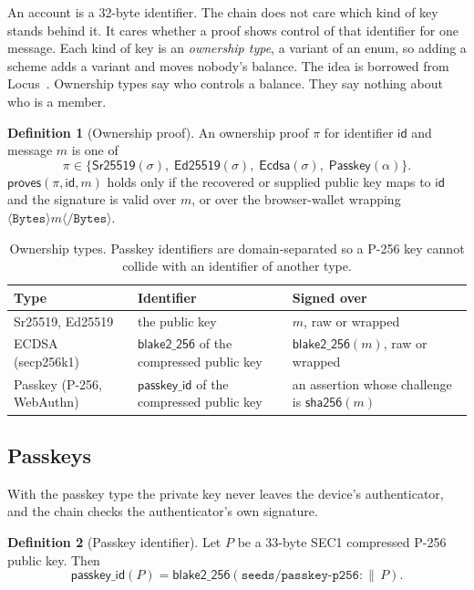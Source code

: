 \documentclass[11pt,a4paper]{article}
\theoremstyle{definition}
\newtheorem{definition}{Definition}[section]
\theoremstyle{plain}
\theoremstyle{remark}
\newcommand{\id}{\mathsf{id}}
\begin{document}
An account is a 32-byte identifier. The chain does not care which kind of key stands behind it. It cares whether a proof shows control of that identifier for one message. Each kind of key is an \emph{ownership type}, a variant of an enum, so adding a scheme adds a variant and moves nobody's balance. The idea is borrowed from Locus~\cite{locus2025}. Ownership types say who controls a balance. They say nothing about who is a member.

\begin{definition}[Ownership proof]
An ownership proof $\pi$ for identifier $\id$ and message $m$ is one of
\[
  \pi \in \{\mathsf{Sr25519}(\sigma),\; \mathsf{Ed25519}(\sigma),\; \mathsf{Ecdsa}(\sigma),\; \mathsf{Passkey}(\alpha)\}.
\]
$\mathsf{proves}(\pi, \id, m)$ holds only if the recovered or supplied public key maps to $\id$ and the signature is valid over $m$, or over the browser-wallet wrapping $\langle\texttt{Bytes}\rangle m \langle\texttt{/Bytes}\rangle$.
\end{definition}

\begin{table}[h]
\centering
\caption{Ownership types. Passkey identifiers are domain-separated so a P-256 key cannot collide with an identifier of another type.}
\label{tab:ownership}
\begin{tabularx}{\textwidth}{@{}l>{\raggedright\arraybackslash}X>{\raggedright\arraybackslash}X@{}}
\toprule
Type & Identifier & Signed over \\
\midrule
Sr25519, Ed25519 & the public key & $m$, raw or wrapped \\
ECDSA (secp256k1) & $\mathsf{blake2\_256}$ of the compressed public key & $\mathsf{blake2\_256}(m)$, raw or wrapped \\
Passkey (P-256, WebAuthn) & $\mathsf{passkey\_id}$ of the compressed public key & an assertion whose challenge is $\mathsf{sha256}(m)$ \\
\bottomrule
\end{tabularx}
\end{table}

\subsection{Passkeys}

With the passkey type the private key never leaves the device's authenticator, and the chain checks the authenticator's own signature.

\begin{definition}[Passkey identifier]
Let $P$ be a 33-byte SEC1 compressed P-256 public key. Then
\[
  \mathsf{passkey\_id}(P) = \mathsf{blake2\_256}(\texttt{seeds/passkey-p256:} \,\|\, P).
\]
\end{definition}
\end{document}

